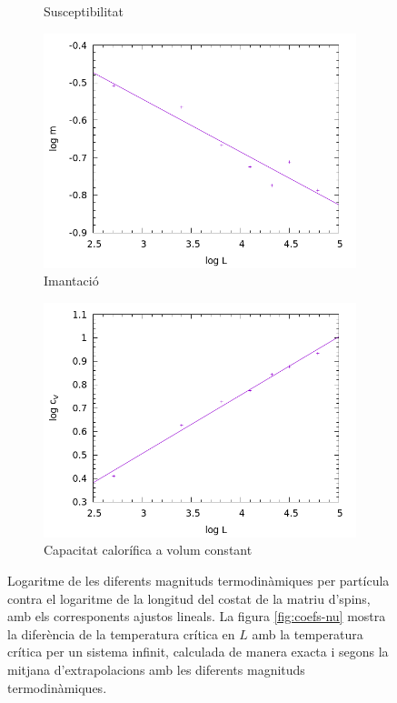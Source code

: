 \documentclass[a4paper]{article}
\begin{document}
\begin{figure}[H]
\begin{subfigure}{.45\textwidth}
        \caption{Susceptibilitat}
        \label{fig:coefs-gammanu}
    \end{subfigure}
        \begin{subfigure}{.45\textwidth}
        \centering
        \includegraphics[width=\textwidth]{coefs-betanu.png}
        \caption{Imantació}
        \label{fig:coefs-betanu}
    \end{subfigure}
    \begin{subfigure}{.45\textwidth}
        \centering
        \includegraphics[width=\textwidth]{coefs-alphanu.png}
        \caption{Capacitat calorífica a volum constant}
        \label{fig:coefs-alphanu}
    \end{subfigure}
    \caption{Logaritme de les diferents magnituds termodinàmiques per partícula contra el logaritme de la longitud del costat de la matriu d'spins, amb els corresponents ajustos lineals. La figura \ref{fig:coefs-nu} mostra la diferència de la temperatura crítica en $L$ amb la temperatura crítica per un sistema infinit, calculada de manera exacta i segons la mitjana d'extrapolacions amb les diferents magnituds termodinàmiques.}
\label{fig:coefs}
\end{figure}
\end{document}
